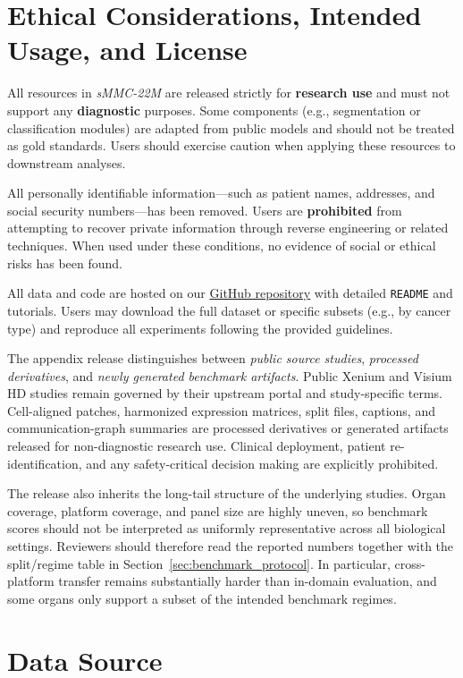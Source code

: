 \documentclass[sigconf,review]{acmart}
\newcommand{\dataset}{sMMC-22M\xspace}
\begin{document}
\section{Ethical Considerations, Intended Usage, and License}
\label{sec:ethics}
\noindent
All resources in \textit{\dataset} are released strictly for \textbf{research use} and must not support any \textbf{diagnostic} purposes. Some components (e.g., segmentation or classification modules) are adapted from public models and should not be treated as gold standards. Users should exercise caution when applying these resources to downstream analyses.

All personally identifiable information—such as patient names, addresses, and social security numbers—has been removed. Users are \textbf{prohibited} from attempting to recover private information through reverse engineering or related techniques. When used under these conditions, no evidence of social or ethical risks has been found.

All data and code are hosted on our
\href{https://anonymous.4open.science/r/sMMC-22M-dataset-ED70}{GitHub repository} with detailed \texttt{README} and tutorials. Users may download the full dataset or specific subsets (e.g., by cancer type) and reproduce all experiments following the provided guidelines.

The appendix release distinguishes between \emph{public source studies}, \emph{processed derivatives}, and \emph{newly generated benchmark artifacts}. Public Xenium and Visium HD studies remain governed by their upstream portal and study-specific terms. Cell-aligned patches, harmonized expression matrices, split files, captions, and communication-graph summaries are processed derivatives or generated artifacts released for non-diagnostic research use. Clinical deployment, patient re-identification, and any safety-critical decision making are explicitly prohibited.

The release also inherits the long-tail structure of the underlying studies. Organ coverage, platform coverage, and panel size are highly uneven, so benchmark scores should not be interpreted as uniformly representative across all biological settings. Reviewers should therefore read the reported numbers together with the split/regime table in Section~\ref{sec:benchmark_protocol}. In particular, cross-platform transfer remains substantially harder than in-domain evaluation, and some organs only support a subset of the intended benchmark regimes.


\section{Data Source}
\label{sec:background}
\end{document}

